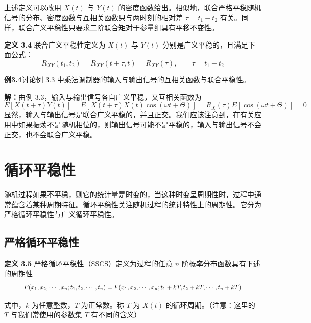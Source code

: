 \documentclass[11pt,openany,UTF8]{ctexbook}
\newcommand{\E}{E}                                 %
\newcommand{\thm}[1]{\par\medskip\noindent\textbf{#1}\quad}
\newcommand{\fw}[1]{{\xeCJKsetup{CJKecglue={}}（#1\nobreak）}}
\newcommand{\ssection}[1]{%
  \renewcommand{\thesection}{\arabic{chapter}.\arabic{section}*}%
  \section{#1}%
  \renewcommand{\thesection}{\arabic{chapter}.\arabic{section}}}
\begin{document}
上述定义可以改用 $X(t)$ 与 $Y(t)$ 的密度函数给出\nobreak。相似地\nobreak，联合严格平稳随机信号的分布\nobreak、密度函数与互相关函数只与两时刻的相对差 $\tau=t_1-t_2$ 有关\nobreak。同样\nobreak，联合广义平稳性只要求二阶联合矩对于参量组具有平移不变性\nobreak。

\thm{定义 3.4} 联合广义平稳性定义为 $X(t)$ 与 $Y(t)$ 分别是广义平稳的\nobreak，且满足下面公式\nobreak：
\[
R_{XY}(t_1,t_2)=R_{XY}(t+\tau,t)=R_{XY}(\tau),\qquad \tau=t_1-t_2
\]

\begin{examplebox}
\textbf{例3.4}\quad 讨论例 3.3 中乘法调制器的输入与输出信号的互相关函数与联合平稳性\nobreak。

\textbf{解\nobreak：}\quad 由例 3.3\nobreak，输入与输出信号各自广义平稳\nobreak，又互相关函数为
\[
\E[X(t+\tau)Y(t)]=\E[X(t+\tau)X(t)\cos(\omega t+\Theta)]=R_X(\tau)\E[\cos(\omega t+\Theta)]=0
\]
显然\nobreak，输入与输出信号是联合广义平稳的\nobreak，并且正交\nobreak。我们应该注意到\nobreak，在有关应用中如果振荡不是随机相位的\nobreak，则输出信号可能不是平稳的\nobreak，输入与输出信号不会正交\nobreak，也不会联合广义平稳\nobreak。
\end{examplebox}

\ssection{循环平稳性}

随机过程如果不平稳\nobreak，则它的统计量是时变的\nobreak，当这种时变呈周期性时\nobreak，过程中通常蕴含着某种周期特征\nobreak。循环平稳性关注随机过程的统计特性上的周期性\nobreak。它分为严格循环平稳性与广义循环平稳性\nobreak。

\subsection{严格循环平稳性}
\thm{定义 3.5} 严格循环平稳性\fw{SSCS}定义为过程的任意 $n$ 阶概率分布函数具有下述的周期性
\begin{equation}
\resizebox{\dimexpr\linewidth-4em\relax}{!}{$\displaystyle
F(x_1,x_2,\cdots,x_n;t_1,t_2,\cdots,t_n)=F(x_1,x_2,\cdots,x_n;t_1+kT,t_2+kT,\cdots,t_n+kT)$}
\label{eq:3.4}
\end{equation}

式中\nobreak，$k$ 为任意整数\nobreak，$T$ 为正常数\nobreak。称 $T$ 为 $X(t)$ 的循环周期\nobreak。（注意\nobreak：这里的 $T$ 与我们常使用的参数集 $T$ 有不同的含义\nobreak）
\end{document}
